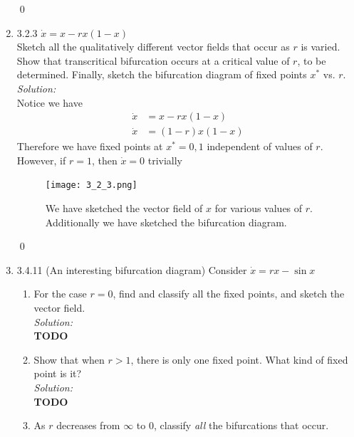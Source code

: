 \documentclass[10pt]{amsart}
\theoremstyle{nonumberplain}
\begin{document}
\begin{enumerate}[label={\bf {\arabic*}:}]
\qed \\ 

\newpage


\item 3.2.3 $\dot x = x - rx(1 - x)$ \\
Sketch all the qualitatively different vector fields that occur as $r$ is varied.
Show that transcritical bifurcation occurs at a critical value of $r$, to be determined.
Finally, sketch the bifurcation diagram of fixed points $x^*$ vs. $r$. \\

\noindent
\textit{Solution:} \\
Notice we have
\begin{align*}
\dot x &= x - rx(1 - x) \\
\dot x &= (1 - r)x(1 - x)
\end{align*}
Therefore we have fixed points at $x^* = 0, 1$ independent of values of $r$.
However, if $r = 1$, then $\dot x = 0$ trivially

\begin{figure}[h]
	\centering
	\texttt{[image: 3\_2\_3.png]}
 	\caption{We have sketched the vector field of $x$ for various values of $r$. Additionally we have sketched the bifurcation diagram.}\label{fig:f4}
\end{figure}

\qed \\ 

\newpage

\item 3.4.11 (An interesting bifurcation diagram) Consider $\dot x = rx - \sin x$ \\
\begin{enumerate}

\item For the case $r = 0$, find and classify all the fixed points, and sketch the vector field. \\

\noindent
\textit{Solution:} \\
\textbf{TODO} \\

\item Show that when $r > 1$, there is only one fixed point.
What kind of fixed point is it? \\

\noindent
\textit{Solution:} \\
\textbf{TODO} \\

\item As $r$ decreases from $\infty$ to $0$, classify \textit{all} the bifurcations that occur. \\


\end{enumerate}
\end{enumerate}
\end{document}
